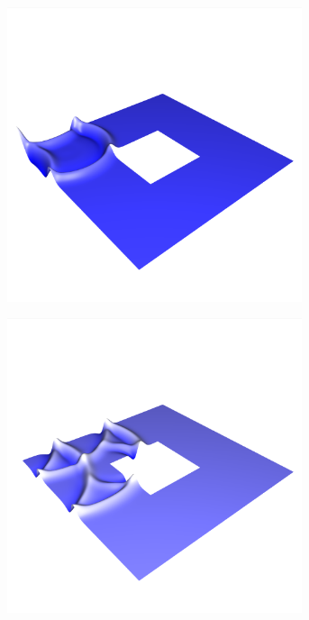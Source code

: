 \documentclass[crop=false,10pt,ngerman]{standalone}
\begin{document}
\begin{figure}[h]
\begin{subfigure}[b]{0.24\textwidth}
          \caption{}
        \end{subfigure}
        \begin{subfigure}[b]{0.24\textwidth}
          \center
          \includegraphics[trim={0.9cm 1.8cm 0.5cm 5cm},clip,width=0.95\textwidth]{images/ring_wave_2.png}
          \caption{}
        \end{subfigure}
        \begin{subfigure}[b]{0.24\textwidth}
          \center
          \includegraphics[trim={0.9cm 1.8cm 0.5cm 5cm},clip,width=0.95\textwidth]{images/ring_wave_3.png}
          \caption{}
        \end{subfigure}


\end{figure}
\end{document}
